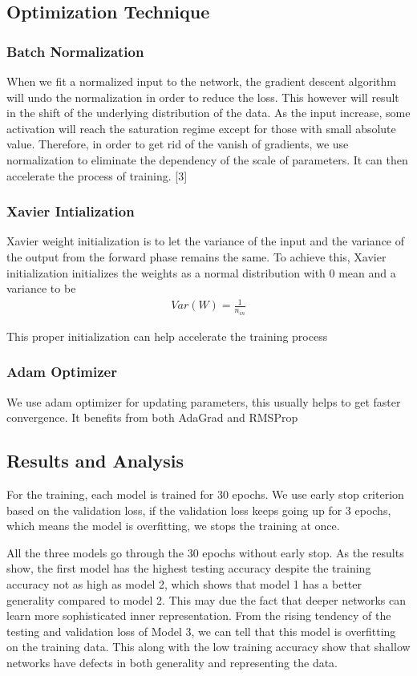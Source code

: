 \documentclass{article}
\begin{document}
\newpage

\subsection{Optimization Technique}
\subsubsection{Batch Normalization}
When we fit a normalized input to the network, the gradient descent algorithm will undo the normalization in order to reduce the loss. This however will result in the shift of the underlying distribution of the data. As the input increase, some activation will reach the saturation regime except for those with small absolute value. Therefore, in order to get rid of the vanish of gradients, we use normalization to eliminate the dependency of the scale of parameters. It can then accelerate the process of training. [3]
\subsubsection{Xavier Intialization}
Xavier weight initialization is to let the variance of the input and the variance of the output from the forward phase remains the same.  To achieve this, Xavier initialization initializes the weights as a normal distribution with 0 mean and a variance to be \begin{align*}
Var(W) = \frac{1}{n_{in}}
\end{align*}

This proper initialization can help accelerate the training process

\subsubsection{Adam Optimizer}
We use adam optimizer for updating parameters, this usually helps to get faster convergence. It benefits from both AdaGrad and RMSProp
\subsection{Results and Analysis}

For the training, each model is trained for 30 epochs. We use early stop criterion based on the validation loss, if the validation loss keeps going up for 3 epochs, which means the model is overfitting, we stops the training at once. 

All the three models go through the 30 epochs without early stop. As the results show, the first model has the highest testing accuracy despite the training accuracy not as high as model 2, which shows that model 1 has a better generality compared to model 2. This may due the fact that deeper networks can learn more sophisticated inner representation. From the rising tendency of the testing and validation loss of Model 3, we can tell that this model is overfitting on the training data. This along with the low training accuracy show that shallow networks have defects in both generality and representing the data. 
\end{document}
